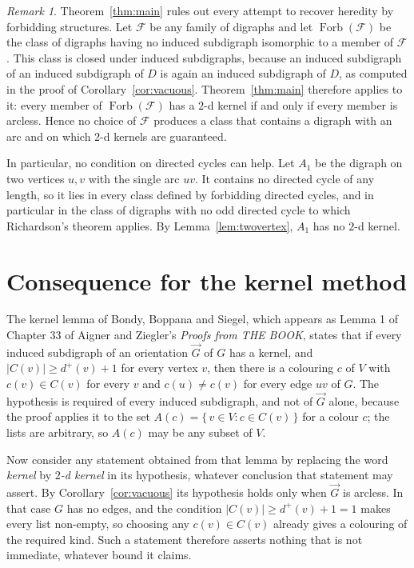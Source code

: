 \documentclass[11pt]{article}
\theoremstyle{plain}
\theoremstyle{definition}
\theoremstyle{remark}
\newtheorem{remark}[theorem]{Remark}
\begin{document}
\begin{remark}\label{rem:noforbidden}
Theorem~\ref{thm:main} rules out every attempt to recover heredity by forbidding structures.
Let $\mathcal{F}$ be any family of digraphs and let $\operatorname{Forb}(\mathcal{F})$ be the
class of digraphs having no induced subdigraph isomorphic to a member of $\mathcal{F}$. This
class is closed under induced subdigraphs, because an induced subdigraph of an induced
subdigraph of $D$ is again an induced subdigraph of $D$, as computed in the proof of
Corollary~\ref{cor:vacuous}. Theorem~\ref{thm:main} therefore applies to it: every member of
$\operatorname{Forb}(\mathcal{F})$ has a $2$-d kernel if and only if every member is arcless.
Hence no choice of $\mathcal{F}$ produces a class that contains a digraph with an arc and on
which $2$-d kernels are guaranteed.

In particular, no condition on directed cycles can help. Let $A_1$ be the digraph on two
vertices $u, v$ with the single arc $uv$. It contains no directed cycle of any length, so it
lies in every class defined by forbidding directed cycles, and in particular in the class of
digraphs with no odd directed cycle to which Richardson's theorem applies. By
Lemma~\ref{lem:twovertex}, $A_1$ has no $2$-d kernel.
\end{remark}

\section{Consequence for the kernel method}

The kernel lemma of Bondy, Boppana and Siegel, which appears as Lemma 1 of Chapter 33 of
Aigner and Ziegler's \emph{Proofs from THE BOOK}, states that if every induced subdigraph of
an orientation $\vec{G}$ of $G$ has a kernel, and $\lvert C(v) \rvert \geq d^{+}(v) + 1$ for
every vertex $v$, then there is a colouring $c$ of $V$ with $c(v) \in C(v)$ for every $v$ and
$c(u) \neq c(v)$ for every edge $uv$ of $G$. The hypothesis is required of every induced
subdigraph, and not of $\vec{G}$ alone, because the proof applies it to the set
$A(c) = \{\, v \in V : c \in C(v) \,\}$ for a colour $c$; the lists are arbitrary, so $A(c)$
may be any subset of $V$.

Now consider any statement obtained from that lemma by replacing the word \emph{kernel} by
\emph{$2$-d kernel} in its hypothesis, whatever conclusion that statement may assert. By
Corollary~\ref{cor:vacuous} its hypothesis holds only when $\vec{G}$ is arcless. In that case
$G$ has no edges, and the condition $\lvert C(v) \rvert \geq d^{+}(v) + 1 = 1$ makes every
list non-empty, so choosing any $c(v) \in C(v)$ already gives a colouring of the required
kind. Such a statement therefore asserts nothing that is not immediate, whatever bound it
claims.
\end{document}
